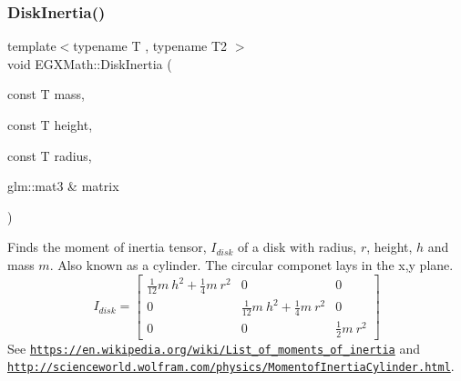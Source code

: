 \subsubsection{\texorpdfstring{Disk\+Inertia()}{DiskInertia()}\hspace{0.1cm}{\footnotesize\ttfamily [3/3]}}
{\footnotesize\ttfamily template$<$typename T , typename T2 $>$ \\
void E\+G\+X\+Math\+::\+Disk\+Inertia (\begin{DoxyParamCaption}\item[{const T}]{mass,  }\item[{const T}]{height,  }\item[{const T}]{radius,  }\item[{glm\+::mat3 \&}]{matrix }\end{DoxyParamCaption})}



Finds the moment of inertia tensor, $I_{disk}$ of a disk with radius, $r$, height, $h$ and mass $m$. Also known as a cylinder. The circular componet lays in the x,y plane. \[ I_{disk}=\begin{bmatrix} \frac{1}{12}m\ h^2 + \frac{1}{4}m\ r^2 & 0 & 0\\ 0 & \frac{1}{12}m\ h^2 + \frac{1}{4}m\ r^2 & 0\\ 0 & 0 & \frac{1}{2}m\ r^2 \end{bmatrix} \] See \href{https://en.wikipedia.org/wiki/List_of_moments_of_inertia}{\tt https\+://en.\+wikipedia.\+org/wiki/\+List\+\_\+of\+\_\+moments\+\_\+of\+\_\+inertia} and \href{http://scienceworld.wolfram.com/physics/MomentofInertiaCylinder.html}{\tt http\+://scienceworld.\+wolfram.\+com/physics/\+Momentof\+Inertia\+Cylinder.\+html}. 


